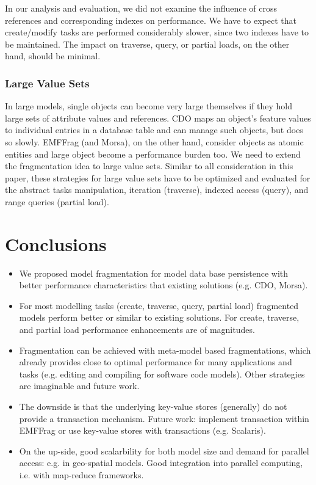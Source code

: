 In our analysis and evaluation, we did not examine the influence of cross references and corresponding indexes on performance. We have to expect that create/modify tasks are performed considerably slower, since two indexes have to be maintained. The impact on traverse, query, or partial loads, on the other hand, should be minimal.

\subsubsection{Large Value Sets}

In large models, single objects can become very large themselves if they hold large sets of attribute values and references. CDO maps an object's feature values to individual entries in a database table and can manage such objects, but does so slowly. EMFFrag (and Morsa), on the other hand, consider objects as atomic entities and large object become a performance burden too. We need to extend the fragmentation idea to large value sets. Similar to all consideration in this paper, these strategies for large value sets have to be optimized and evaluated for the abstract tasks manipulation, iteration (traverse), indexed access (query), and range queries (partial load). 

\section{Conclusions}\label{sec:conclusions}


\begin{itemize}

\item We proposed model fragmentation for model data base persistence with better performance characteristics that existing solutions (e.g. CDO, Morsa).

\item For most modelling tasks (create, traverse, query, partial load) fragmented models perform better or similar to existing solutions. For create, traverse, and partial load performance enhancements are of magnitudes.

\item Fragmentation can be achieved with meta-model based fragmentations, which already provides close to optimal performance for many applications and tasks (e.g. editing and compiling for software code models). Other strategies are imaginable and future work.

\item The downside is that the underlying key-value stores (generally) do not provide a transaction mechanism. Future work: implement transaction within EMFFrag or use key-value stores with transactions (e.g. Scalaris).

\item On the up-side, good scalarbility for both model size and demand for parallel access: e.g. in geo-spatial models. Good integration into parallel computing, i.e. with map-reduce frameworks.

\end{itemize}